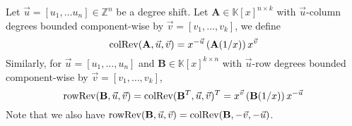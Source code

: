 \begin{defn}
Let $\vec{u}=\left[u_{1},\dots u_{n}\right]\in\mathbb{Z}^{n}$ be
a degree shift. Let $\mathbf{A}\in\mathbb{K}\left[x\right]^{n\times k}$
with $\vec{u}$-column degrees bounded component-wise by $\vec{v}=\left[v_{1},\dots,v_{k}\right]$,
we define 
\[
\operatorname{colRev}(\mathbf{A},\vec{u},\vec{v})=x^{-\vec{u}}\left(\mathbf{A}(1/x)\right)x^{\vec{v}}
\]
 Similarly, for $\vec{u}=\left[u_{1},\dots,u_{n}\right]$ and $\mathbf{B}\in\mathbb{K}\left[x\right]^{k\times n}$
with $\vec{u}$-row degrees bounded component-wise by $\vec{v}=\left[v_{1},\dots,v_{k}\right]$,
\[
\operatorname{rowRev}(\mathbf{B},\vec{u},\vec{v})=\operatorname{colRev}(\mathbf{B}^{T},\vec{u},\vec{v})^{T}=x^{\vec{v}}\left(\mathbf{B}(1/x)\right)x^{-\vec{u}}
\]
 Note that we also have $\operatorname{rowRev}(\mathbf{B},\vec{u},\vec{v})=\operatorname{colRev}(\mathbf{B},-\vec{v},-\vec{u})$.
\end{defn}
\begin{comment}
Again, we assume a shift $\vec{s}$ bounds the column degrees of $\mathbf{F}$
component-wise with $\sum\vec{s}=\xi$. First, we compute a $\vec{s}$-minimal
kernel basis $\mathbf{N}$ of $\mathbf{F}$. We then reverse the coefficients
of $\mathbf{N}$ based on its $\vec{s}$-column degrees as follows:
To reverse the coefficients of column $\mathbf{n}$ that has $\vec{s}$-column
degrees bounded by $t$, let
\[
\reverse(\mathbf{n},\vec{s},t)=x^{-\vec{s}}\left(\mathbf{n}(1/x)\right)x^{t}=\begin{bmatrix}x^{-s_{1}}\\
 & \ddots\\
 &  & x^{-s_{n}}
\end{bmatrix}\left(\mathbf{n}(1/x)\right)x^{t}.
\]
 I.e., for the $i$th entry $\mathbf{n}_{i}$ of $\mathbf{n}$, where
$\mathbf{n}_{i}=p_{0}+p_{1}x+\dots+p_{t-s_{i}}x^{t-s_{i}}$, the reversed
$\mathbf{n}$ becomes $\reverse(\mathbf{n},\vec{s},t)=p_{t-s_{i}}+p_{t-s_{i}-1}x+\cdots+p_{1}x^{t-s_{i}-1}+p_{0}x^{t-s_{i}}.$
Each column of $\mathbf{N}$ is reversed in this way to get a new
matrix $\bar{\mathbf{N}}$. That is, for matrix $\mathbf{N}\in\mathbb{K}\left[x\right]^{n\times k}$
with $\vec{s}$-column degrees bounded component-wise by $\vec{t}$,
we define 
\[
\reverse(\mathbf{N},\vec{s},\vec{t})=x^{-\vec{s}}\left(\mathbf{N}(1/x)\right)x^{\vec{t}}=\begin{bmatrix}x^{-s_{1}}\\
 & \ddots\\
 &  & x^{-s_{n}}
\end{bmatrix}\left(\mathbf{N}(1/x)\right)\begin{bmatrix}x^{t_{1}}\\
 & \ddots\\
 &  & x^{t_{k}}
\end{bmatrix}.
\]


We then compute a $\left(\bar{\mathbf{N}}^{T},\sigma,-\vec{s}\right)$-basis
$\bar{\mathbf{P}}'$ with $\sigma$ big enough to contain a complete
kernel basis $\bar{\mathbf{F}}'$ of $\bar{\mathbf{N}}^{T}$. Let
$\mathbf{P}$ and $\mathbf{F'}$ be the matrices $\bar{\mathbf{P}}'$
and $\mathbf{\bar{F}'}$ with coefficients reversed based on their
$(-\vec{s})$-column degrees respectively. Then it is not difficult
to see that $\mathbf{F}'$ is a kernel basis of $\mathbf{N}'$.
\end{comment}


